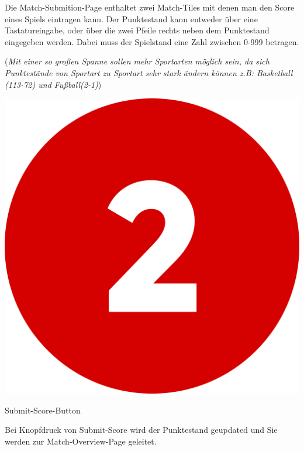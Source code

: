 Die Match-Submition-Page enthaltet zwei Match-Tiles mit denen man den Score eines Spiels eintragen kann.
Der Punktestand kann entweder über eine Tastatureingabe, oder über die zwei Pfeile rechts neben dem Punktestand eingegeben werden.
Dabei muss der Spielstand eine Zahl zwischen 0-999 betragen.

(\textit{Mit einer so großen Spanne sollen mehr Sportarten möglich sein, da sich Punktestände von Sportart zu Sportart sehr stark ändern können z.B: Basketball (113-72) und Fußball(2-1)})

\bigskip
\includegraphics[scale=0.05]{pics/user-guide/numbers/number-2.png} \begin{LARGE} Submit-Score-Button \end{LARGE}

Bei Knopfdruck von Submit-Score wird der Punktestand geupdated und Sie werden zur Match-Overview-Page geleitet.

